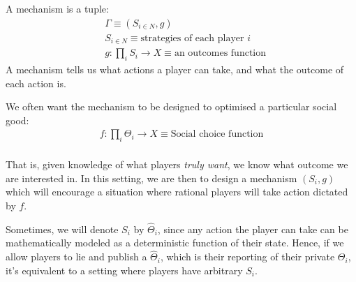 \documentclass[11pt]{book}
\begin{document}
A mechanism is a tuple:
\begin{align*}
    &\Gamma \equiv (S_{i \in N}, g) \\
    &S_{i \in N} \equiv \text{strategies of each player $i$} \\
    &g: \prod_i S_i \rightarrow X \equiv \text{an outcomes function}
\end{align*}
A mechanism tells us what actions a player can take, and what the outcome
of each action is.

We often want the mechanism to be designed to optimised a particular social good:
\begin{align*}
    f: \prod_i \Theta_i \rightarrow X \equiv \text{Social choice function} \\
\end{align*}

That is, given knowledge of what players \emph{truly want}, we know what
outcome we are interested in. In this setting, we are then to design 
a mechanism $(S_i, g)$ which will encourage a situation where rational players
will take action dictated by $f$.

Sometimes, we will denote $S_i$ by $\hat \Theta_i$, since any action the
player can take can be mathematically modeled as a deterministic function
of their state. Hence, if we allow players to lie and publish 
a $\hat \Theta_i$, which is their reporting of their private $\Theta_i$, it's
equivalent to a setting where players have arbitrary $S_i$.
\end{document}
